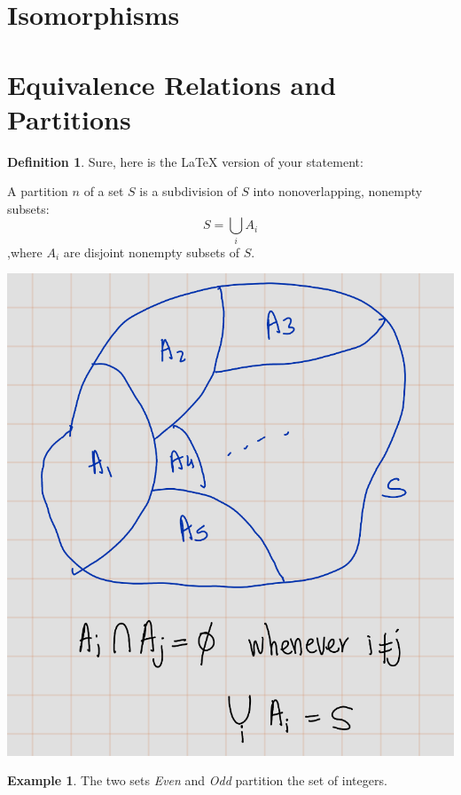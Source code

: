 \documentclass[
]{book}
\theoremstyle{definition}
\newtheorem{definition}{Definition}[chapter]
\theoremstyle{definition}
\newtheorem{example}{Example}[chapter]
\theoremstyle{definition}
\theoremstyle{definition}
\theoremstyle{remark}
\begin{document}
\hypertarget{isomorphisms}{%
\section{Isomorphisms}\label{isomorphisms}}

\hypertarget{equivalence-relations-and-partitions}{%
\section{Equivalence Relations and Partitions}\label{equivalence-relations-and-partitions}}

\begin{definition}
\protect\hypertarget{def:unnamed-chunk-16}{}\label{def:unnamed-chunk-16}Sure, here is the LaTeX version of your statement:

A partition \(n\) of a set \(S\) is a subdivision of \(S\) into nonoverlapping, nonempty subsets:
\[S = \bigcup_{i} A_i\]
,where \(A_i\) are disjoint nonempty subsets of \(S\).
\end{definition}

\includegraphics{figures/ch_2/fig32.png}

\begin{example}
\protect\hypertarget{exm:unnamed-chunk-17}{}\label{exm:unnamed-chunk-17}The two sets \emph{Even} and \emph{Odd} partition the set of integers.
\end{example}
\end{document}
